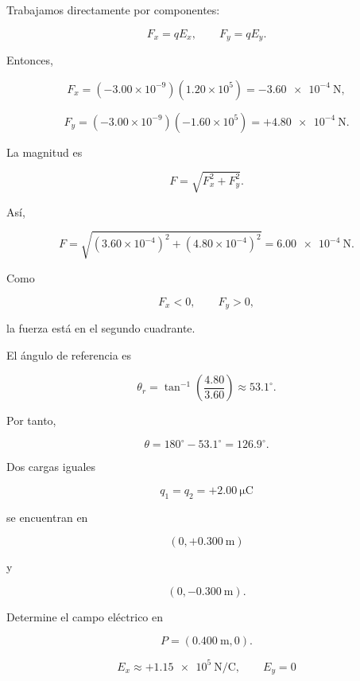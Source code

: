 \begin{explicacion}

Trabajamos directamente por componentes:

\[
F_x=qE_x,\qquad F_y=qE_y.
\]

Entonces,

\[
F_x=(-3.00\times10^{-9})(1.20\times10^5)
=-\SI{3.60e-4}{\newton},
\]

\[
F_y=(-3.00\times10^{-9})(-1.60\times10^5)
=+\SI{4.80e-4}{\newton}.
\]

La magnitud es

\[
F=\sqrt{F_x^2+F_y^2}.
\]

Así,

\[
F=\sqrt{(3.60\times10^{-4})^2+(4.80\times10^{-4})^2}
=\SI{6.00e-4}{\newton}.
\]

Como

\[
F_x<0,\qquad F_y>0,
\]

la fuerza está en el segundo cuadrante.

El ángulo de referencia es

\[
\theta_r=\tan^{-1}\left(\frac{4.80}{3.60}\right)\approx53.1^\circ.
\]

Por tanto,

\[
\theta=180^\circ-53.1^\circ=126.9^\circ.
\]

\end{explicacion}


\begin{ejercicio}

Dos cargas iguales

\[
q_1=q_2=+\SI{2.00}{\micro\coulomb}
\]

se encuentran en

\[
(0,+\SI{0.300}{\metre})
\]

y

\[
(0,-\SI{0.300}{\metre}).
\]

Determine el campo eléctrico en

\[
P=(\SI{0.400}{\metre},0).
\]

\end{ejercicio}

\begin{respuesta}

\[
\boxed{E_x\approx+\SI{1.15e5}{\newton\per\coulomb}},
\qquad
\boxed{E_y=0}
\]

\end{respuesta}

